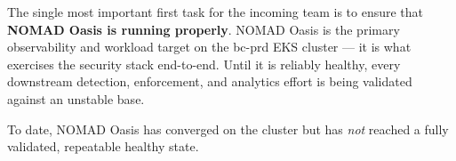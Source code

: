 \documentclass[11pt,a4paper]{report}
\begin{document}
The single most important first task for the incoming team is to ensure that
\textbf{NOMAD Oasis is running properly}. NOMAD Oasis is the primary observability
and workload target on the bc-prd EKS cluster — it is what exercises the security
stack end-to-end. Until it is reliably healthy, every downstream detection,
enforcement, and analytics effort is being validated against an unstable base.

To date, NOMAD Oasis has converged on the cluster but has \emph{not} reached a
fully validated, repeatable healthy state.


   
\end{document}
